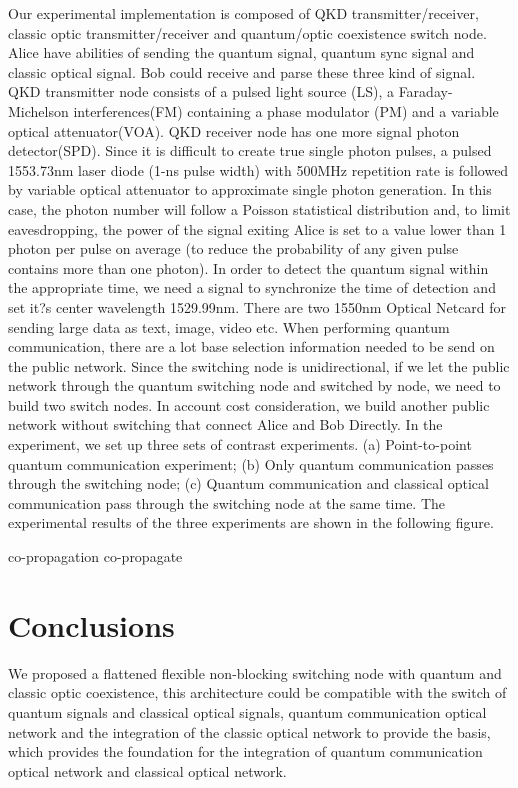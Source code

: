 \documentclass[letterpaper,10pt]{article}
\begin{document}
Our experimental implementation is composed of QKD transmitter/receiver, classic optic transmitter/receiver and quantum/optic coexistence switch node. Alice have abilities of sending the quantum signal, quantum sync signal and classic optical signal. Bob could receive and parse these three kind of signal. QKD transmitter node consists of a pulsed light source (LS), a Faraday-Michelson interferences(FM) containing a phase modulator (PM) and a variable optical attenuator(VOA). QKD receiver node has one more signal photon detector(SPD). Since it is difficult to create true single photon pulses, a pulsed 1553.73nm laser diode (1-ns pulse width) with 500MHz repetition rate is followed by variable optical attenuator to approximate single photon generation. In this case, the photon number will follow a Poisson statistical distribution and, to limit eavesdropping, the power of the signal exiting Alice is set to a value lower than 1 photon per pulse on average (to reduce the probability of  any given pulse contains more than one photon). In order to detect the quantum signal within the appropriate time, we need a signal to synchronize the time of detection and set it?s center wavelength 1529.99nm. There are two 1550nm Optical Netcard for sending large data as text, image, video etc. When performing quantum communication, there are a lot base selection information needed to be send on the public network. Since the switching node is unidirectional, if we let the public network through the quantum switching node and switched by node, we need to build two switch nodes. In account cost consideration, we build another public network without switching  that connect Alice and Bob Directly. In the experiment, we set up three sets of contrast experiments. (a) Point-to-point quantum communication experiment; (b) Only quantum communication passes through the switching node; (c) Quantum communication and classical optical communication pass through the switching node at the same time. The experimental results of the three experiments are shown in the following figure.

co-propagation
co-propagate

\section{Conclusions}
We proposed a flattened flexible non-blocking switching node with quantum and classic optic coexistence, this architecture could be compatible with the switch of quantum signals and classical optical signals,  quantum communication optical network and the integration of the classic optical network to provide the basis, which provides the foundation for the integration of quantum communication optical network and classical optical network.
\end{document}
